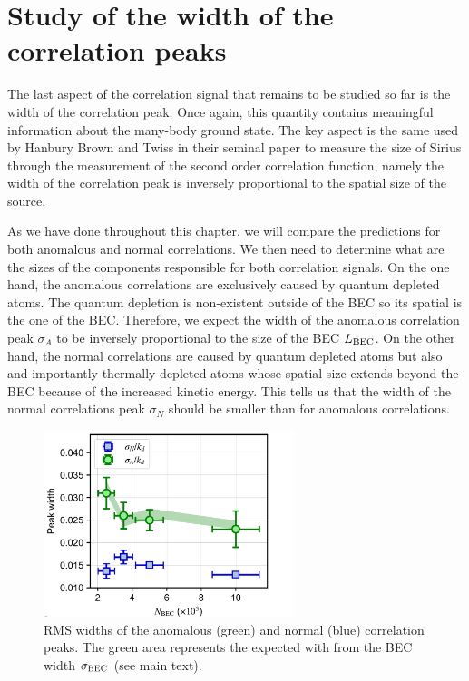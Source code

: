 \section{Study of the width of the correlation peaks}

The last aspect of the \kmk correlation signal that remains to be studied so far is the width of the correlation peak. Once again, this quantity contains meaningful information about the many-body ground state. The key aspect is the same used by Hanbury Brown and Twiss in their seminal paper to measure the size of Sirius through the measurement of the second order correlation function, namely the width of the correlation peak is inversely proportional to the spatial size of the source. 


As we have done throughout this chapter, we will compare the predictions for both anomalous and normal correlations. We then need to determine what are the sizes of the components responsible for both correlation signals. On the one hand, the anomalous correlations are exclusively caused by quantum depleted atoms. The quantum depletion is non-existent outside of the BEC so its spatial is the one of the BEC. Therefore, we expect the width of the anomalous correlation peak $\sigma_A$ to be inversely proportional to the size of the BEC $L_{\rm{BEC}}$. On the other hand, the normal correlations are caused by quantum depleted atoms but also and importantly thermally depleted atoms whose spatial size extends beyond the BEC because of the increased kinetic energy. This tells us that the width of the normal correlations peak $\sigma_N$ should be smaller than for anomalous correlations.

\begin{figure}
    \centering
    \includegraphics[width=0.65\textwidth]{Fig/Chapter4/widths.png}
    \caption{RMS widths of the anomalous (green) and normal (blue) correlation peaks. The green area represents the expected with from the BEC width $\sigma_{\rm{BEC}}$ (see main text).}
    \label{fig:width}
\end{figure}

